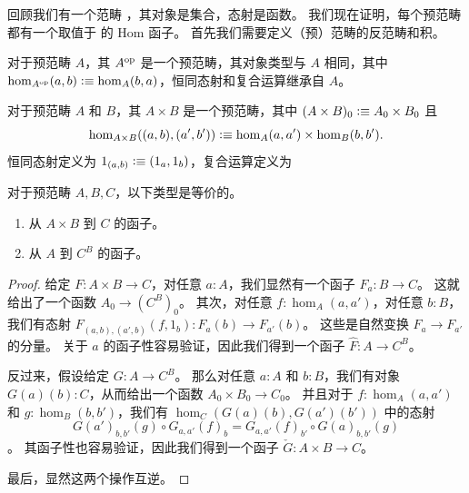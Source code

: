 回顾我们有一个范畴 \uset，其对象是集合，态射是函数。
我们现在证明，每个预范畴都有一个取值于 \uset 的 Hom 函子。
首先我们需要定义（预）范畴的反范畴和积。

\begin{defn}\label{ct:opposite-category}
  对于预范畴 $A$，其
  $A^{\mathrm{op}}$ 是一个预范畴，其对象类型与 $A$ 相同，其中 $\hom_{A^{\mathrm{op}}}(a,b) \vcentcolon\equiv \hom_A(b,a)$，恒同态射和复合运算继承自 $A$。
\end{defn}

\begin{defn}\label{ct:prod-cat}
  对于预范畴 $A$ 和 $B$，其
  $A\times B$ 是一个预范畴，其中 $(A\times B)_0 \vcentcolon\equiv A_0 \times B_0$ 且
  \[\hom_{A\times B}((a,b),(a',b')) \vcentcolon\equiv \hom_A(a,a') \times \hom_B(b,b').\]
  恒同态射定义为 $1_{(a,b)}\vcentcolon\equiv (1_a,1_b)$，复合运算定义为
\end{defn}

\begin{lem}\label{ct:functorexpadj}
  对于预范畴 $A,B,C$，以下类型是等价的。
  \begin{enumerate}
  \item 从 $A\times B$ 到 $C$ 的函子。
  \item 从 $A$ 到 $C^B$ 的函子。
  \end{enumerate}
\end{lem}

\begin{proof}
  给定 $F:A\times B\to C$，对任意 $a:A$，我们显然有一个函子 $F_a : B\to C$。
  这就给出了一个函数 $A_0 \to (C^B)_0$。
  其次，对任意 $f:\hom_A(a,a')$，对任意 $b:B$，我们有态射 $F_{(a,b),(a',b)}(f,1_b):F_a(b) \to F_{a'}(b)$。
  这些是自然变换 $F_a \to F_{a'}$ 的分量。
  关于 $a$ 的函子性容易验证，因此我们得到一个函子 $\hat{F}:A\to C^B$。

  反过来，假设给定 $G:A\to C^B$。
  那么对任意 $a:A$ 和 $b:B$，我们有对象 $G(a)(b):C$，从而给出一个函数 $A_0 \times B_0 \to C_0$。
  并且对于 $f:\hom_A(a,a')$ 和 $g:\hom_B(b,b')$，我们有 $\hom_C(G(a)(b), G(a')(b'))$ 中的态射
  \begin{equation*}
     G(a')_{b,b'}(g)\circ G_{a,a'}(f)_b = G_{a,a'}(f)_{b'} \circ  G(a)_{b,b'}(g)
  \end{equation*}。
  其函子性也容易验证，因此我们得到一个函子 $\check{G}:A\times B \to C$。

  最后，显然这两个操作互逆。
\end{proof}

